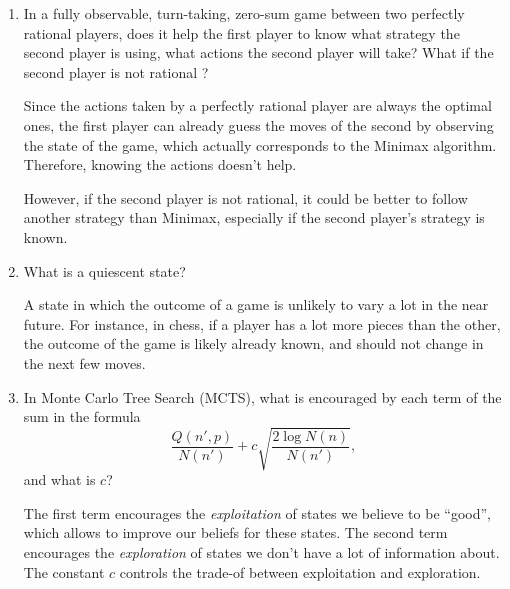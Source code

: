 \documentclass[11pt, a4paper]{article}
\begin{document}
\begin{enumerate}
    \item In a fully observable, turn-taking, zero-sum game between two perfectly rational players, does it help the first player to know what strategy the second player is using, \ie{} what actions the second player will take? What if the second player is not rational ?

    \begin{solution}
        Since the actions taken by a perfectly rational player are always the optimal ones, the first player can already guess the moves of the second by observing the state of the game, which actually corresponds to the Minimax algorithm. Therefore, knowing the actions doesn't help.

        However, if the second player is not rational, it could be better to follow another strategy than Minimax, especially if the second player's strategy is known.
    \end{solution}

    \item What is a quiescent state?

    \begin{solution}
        A state in which the outcome of a game is unlikely to vary a lot in the near future. For instance, in chess, if a player has a lot more pieces than the other, the outcome of the game is likely already known, and should not change in the next few moves.
    \end{solution}

    \item In Monte Carlo Tree Search (MCTS), what is encouraged by each term of the sum in the formula
    \begin{equation*}
        \frac{Q(n', p)}{N(n')} + c \sqrt{\frac{2 \log N(n)}{N(n')}},
    \end{equation*}
    and what is $c$?

    \begin{solution}
        The first term encourages the \emph{exploitation} of states we believe to be \enquote{good}, which allows to improve our beliefs for these states. The second term encourages the \emph{exploration} of states we don't have a lot of information about. The constant $c$ controls the trade-of between exploitation and exploration.
    \end{solution}
\end{enumerate}

\newpage
\end{document}
